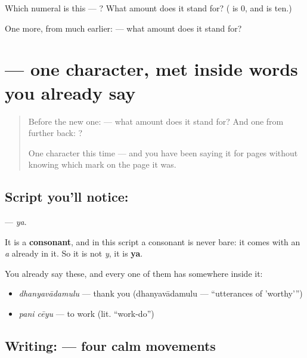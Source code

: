 \begin{tcolorbox}[breakable,colback=teal!4,colframe=teal!35!black,title={Before you move on}]
Which numeral is this — ? What amount does it stand for? ( is 0, and  is ten.)

One more, from much earlier:  — what amount does it stand for?
\end{tcolorbox}
\section[\texorpdfstring{\te{య} (ya)}{య (ya)}]{ — one character, met inside words you already say}

\label{lesson:TE-S110-letter-ya}



\begin{quote}
Before the new one:  — what amount does it stand for? And one from further back: ?

One character this time — and you have been saying it for pages without knowing which mark on the page it was.
\end{quote}

\subsection*{Script you'll notice: }
\textbf{} — \emph{ya}.

It is a \textbf{consonant}, and in this script a consonant is never bare: it comes with an \emph{a} already in it. So it is not \emph{y}, it is \textbf{ya}.

You already say these, and every one of them has  somewhere inside it:

\begin{itemize}
\raggedright
  \item \textbf{} \emph{dhanyavādamulu} — thank you (dhanyavādamulu — \textquotedblleft{}utterances of 'worthy'\textquotedblright{})
  \item \textbf{ } \emph{pani cēyu} — to work (lit. \textquotedblleft{}work-do\textquotedblright{})
\end{itemize}

\subsection*{Writing:  — four calm movements}

